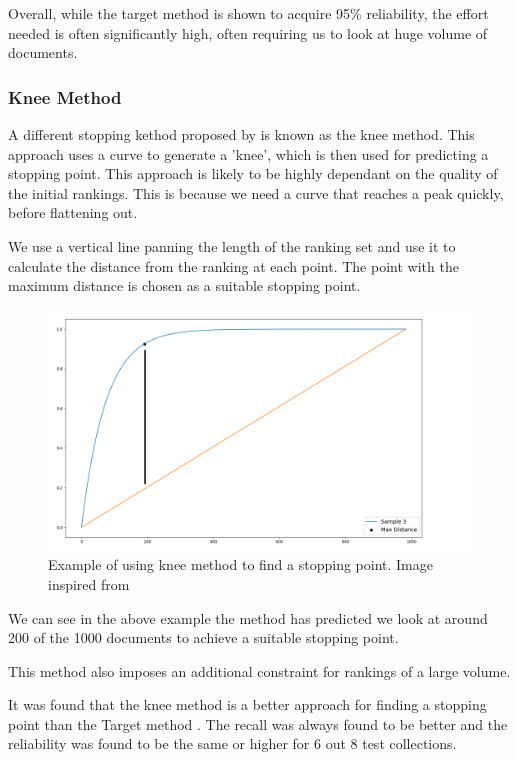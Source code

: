 Overall, while the target method is shown to acquire 95\% reliability, the effort needed is often significantly high, often requiring us to look at huge volume of documents.



\subsubsection{Knee Method} \label{knee}

A different stopping kethod proposed by \cite{Satopa11} is known as the knee method. This approach uses a curve to generate a 'knee', which is then used for predicting a stopping point. This approach is likely to be highly dependant on the quality of the initial rankings. This is because we need a curve that reaches a peak quickly, before flattening out.

We use a vertical line panning the length of the ranking set and use it to calculate the distance from the ranking at each point. The point with the maximum distance is chosen as a suitable stopping point.

\begin{figure}[H]
\center
\includegraphics[width=13cm]{figures/knee.png}
\caption{Example of using knee method to find a stopping point. Image inspired from \cite{Satopa11}}
\end{figure}

We can see in the above example the method has predicted we look at around 200 of the 1000 documents to achieve a suitable stopping point.

This method also imposes an additional constraint for rankings of a large volume. 

It was found that the knee method is a better approach for finding a stopping point than the Target method \cite{Cormack2016}. The recall was always found to be better and the reliability was found to be the same or higher for 6 out 8 test collections.



